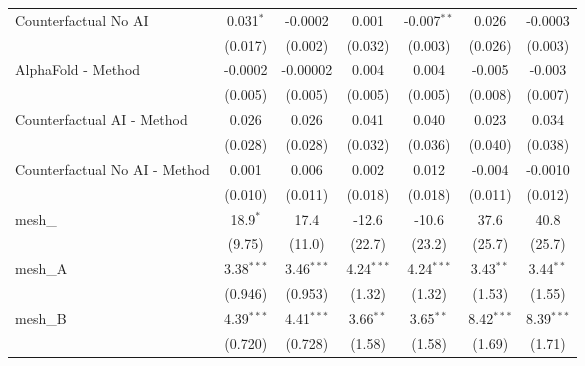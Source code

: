 \begin{tabular}{lcccccc}
   Counterfactual No AI                                        & 0.031$^{*}$   & -0.0002       & 0.001        & -0.007$^{**}$ & 0.026          & -0.0003\\   
                                                               & (0.017)       & (0.002)       & (0.032)      & (0.003)       & (0.026)        & (0.003)\\   
   AlphaFold - Method                                          & -0.0002       & -0.00002      & 0.004        & 0.004         & -0.005         & -0.003\\   
                                                               & (0.005)       & (0.005)       & (0.005)      & (0.005)       & (0.008)        & (0.007)\\   
   Counterfactual AI - Method                                  & 0.026         & 0.026         & 0.041        & 0.040         & 0.023          & 0.034\\   
                                                               & (0.028)       & (0.028)       & (0.032)      & (0.036)       & (0.040)        & (0.038)\\   
   Counterfactual No AI - Method                               & 0.001         & 0.006         & 0.002        & 0.012         & -0.004         & -0.0010\\   
                                                               & (0.010)       & (0.011)       & (0.018)      & (0.018)       & (0.011)        & (0.012)\\   
   mesh\_                                                      & 18.9$^{*}$    & 17.4          & -12.6        & -10.6         & 37.6           & 40.8\\   
                                                               & (9.75)        & (11.0)        & (22.7)       & (23.2)        & (25.7)         & (25.7)\\   
   mesh\_A                                                     & 3.38$^{***}$  & 3.46$^{***}$  & 4.24$^{***}$ & 4.24$^{***}$  & 3.43$^{**}$    & 3.44$^{**}$\\   
                                                               & (0.946)       & (0.953)       & (1.32)       & (1.32)        & (1.53)         & (1.55)\\   
   mesh\_B                                                     & 4.39$^{***}$  & 4.41$^{***}$  & 3.66$^{**}$  & 3.65$^{**}$   & 8.42$^{***}$   & 8.39$^{***}$\\   
                                                               & (0.720)       & (0.728)       & (1.58)       & (1.58)        & (1.69)         & (1.71)\\   

\end{tabular}
